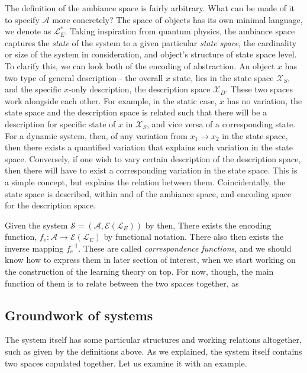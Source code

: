 The definition of the ambiance space is fairly arbitrary. What can be made of it to specify $\mathcal{A}$ more concretely? The space of objects has its own minimal language, we denote as $\mathcal{L}_{E}^{*}$. Taking inspiration from quantum physics, the ambiance space captures the \textit{state} of the system to a given particular \textit{state space}, the cardinality or size of the system in consideration, and object's structure of state space level. To clarify this, we can look both of the encoding of abstraction. An object $x$ has two type of general description - the overall $x$ state, lies in the state space $\mathcal{X}_{S}$, and the specific $x$-only description, the description space $\mathcal{X}_{D}$. These two spaces work alongside each other. For example, in the static case, $x$ has no variation, the state space and the description space is related such that there will be a description for specific state of $x$ in $\mathcal{X}_{S}$, and vice versa of a corresponding state. For a dynamic system, then, of any variation from $x_{1}\to x_{2}$ in the state space, then there exists a quantified variation that explains such variation in the state space. Conversely, if one wish to vary certain description of the description space, then there will have to exist a corresponding variation in the state space. This is a simple concept, but explains the relation between them. Coincidentally, the state space is described, within and of the ambiance space, and encoding space for the description space. 

Given the system $\mathcal{S}=(\mathcal{A},\mathcal{E}(\mathcal{L}_{E}))$ by then, There exists the encoding function, $f_{e}: \mathcal{A}\to \mathcal{E}(\mathcal{L}_{E})$ by functional notation. There also then exists the inverse mapping $f_{e}^{-1}$. These are called \textit{correspondence functions}, and we should know how to express them in later section of interest, when we start working on the construction of the learning theory on top. For now, though, the main function of them is to relate between the two spaces together, as 

\subsection{Groundwork of systems}

The system itself has some particular structures and working relations altogether, such as given by the definitions above. As we explained, the system itself contains two spaces copulated together. Let us examine it with an example. 

